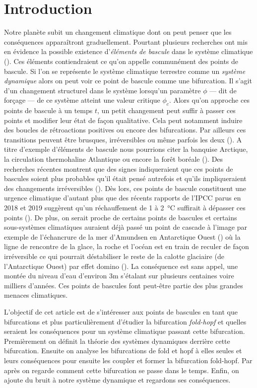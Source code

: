 \section{Introduction}

Notre planète subit un changement climatique dont on peut penser que les conséquences apparaîtront graduellement. Pourtant plusieurs recherches ont mis en évidence la possible existence d'\emph{éléments de bascule} dans le système climatique (\cite{lenton_tipping_2008}). Ces éléments contiendraient ce qu'on appelle communément des points de bascule. Si l'on se représente le système climatique terrestre comme un \emph{système dynamique} alors on peut voir ce point de bascule comme une bifurcation. Il s'agit d'un changement structurel dans le système lorsqu'un paramètre $\phi$ --- dit de forçage --- de ce système atteint une valeur critique $\phi_c$. Alors qu'on approche ces points de bascule à un temps $t$, un petit changement peut suffir à passer ces points et modifier leur état de façon qualitative. Cela peut notamment induire des boucles de rétroactions positives ou encore des bifurcations. Par ailleurs ces transitions peuvent être brusques, irréversibles ou même parfois les deux (\cite{Lenton_2012}). A titre d'exemple d'éléments de bascule nous pourrions citer la banquise Arctique, la circulation thermohaline Atlantique ou encore la forêt boréale (\cite{lenton_tipping_2008}). Des recherches récentes montrent que des signes indiqueraient que ces points de bascules soient plus probables qu'il était pensé autrefois et qu'ils impliqueraient des changements irréversibles (\cite{lenton_climate_2019_too_risky}). Dès lors, ces points de bascule constituent une urgence climatique d'autant plus que des récents rapports de l'IPCC parus en 2018 et 2019 suggèrent qu'un réchauffement de 1 à \SI{2}{\celsius} suffirait à dépasser ces points (\cite{ipcc_global_2018,portner_ipcc_2019}). De plus, on serait proche de certains points de bascules et certains sous-systèmes climatiques auraient déjà passé un point de cascade à l'image par exemple de l'échancrure de la mer d'Amundsen en Antarctique Ouest (\cite{portner_ipcc_2019}) où la ligne de rencontre de la glace, la roche et l'océan est en train de reculer de façon irréversible ce qui pourrait déstabiliser le reste de la calotte glaciaire (de l'Antarctique Ouest) par effet domino (\cite{feldmann_collapse_2015_amundsen}). La conséquence est sans appel, une montée du niveau d'eau d'environ 3m s'étalant sur plusieurs centaines voire milliers d'années. Ces points de bascules font peut-être partie des plus grandes menaces climatiques.

L'objectif de cet article est de s'intéresser aux points de bascules en tant que bifurcations et plus particulièrement d'étudier la bifurcation \emph{fold-hopf} et quelles seraient les conséquences pour un système climatique passant cette bifurcation. Premièrement on définit la théorie des systèmes dynamiques derrière cette bifurcation. Ensuite on analyse les bifurcations de fold et hopf à elles seules et leurs conséquences pour ensuite les coupler et former la bifurcation fold-hopf. Par après on regarde comment cette bifurcation se passe dans le temps. Enfin, on ajoute du bruit à notre système dynamique et regardons ses conséquences.
